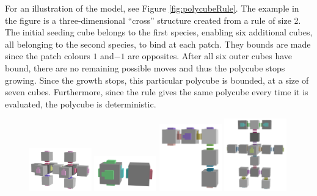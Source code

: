 For an illustration of the model, see Figure \ref{fig:polycubeRule}. The example in the figure is a three-dimensional ``cross'' structure created from a rule of size 2. The initial seeding cube belongs to the first species, enabling six additional cubes, all belonging to the second species, to bind at each patch. They bounds are made since the patch colours \(1\) and\( -1\) are opposites. After all six outer cubes have bound, there are no remaining possible moves and thus the polycube stops growing. Since the growth stops, this particular polycube is bounded, at a size of seven cubes. Furthermore, since the rule gives the same polycube every time it is evaluated, the polycube is deterministic.

\begin{figure}
    \centering\includegraphics[align=c,width=0.24\textwidth]{figures/dnaRoboticPolycubes/doubleplus.png}\hfill
    \centering\includegraphics[align=c,width=0.24\textwidth]{figures/dnaRoboticPolycubes/swimmer.png}\hfill
    \centering\includegraphics[align=c,width=0.24\textwidth]{figures/dnaRoboticPolycubes/L.png}\hfill
    \centering\includegraphics[align=c,width=0.24\textwidth]{figures/dnaRoboticPolycubes/robot.png}

\end{figure}
